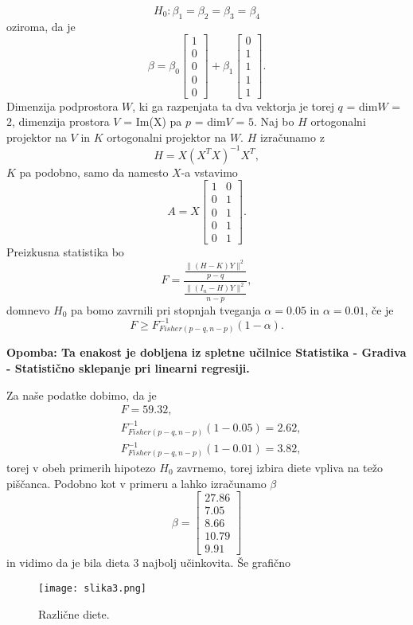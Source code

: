 \documentclass[a4paper,12pt]{article}
\begin{document}
$$ H_0 : \beta_1 = \beta_2 = \beta_3 = \beta_4
$$
oziroma, da je 
$$\beta = \beta_0 \begin{bmatrix}
    1 \\
    0 \\
    0 \\
    0 \\
    0 
\end{bmatrix} + 
\beta_1 \begin{bmatrix}
    0 \\
    1 \\
    1 \\
    1 \\
    1 
\end{bmatrix}.
$$
Dimenzija podprostora $W$, ki ga razpenjata ta dva vektorja je torej $q$ = dim$W$ = $2$, dimenzija prostora $V$ = Im(X) pa $p$ = dim$V$ = $5$.
Naj bo $H$ ortogonalni projektor na $V$ in $K$ ortogonalni projektor na $W$. $H$ izračunamo z 
$$ H = X(X^{T}X)^{-1}X^{T},
$$
$K$ pa podobno, samo da namesto $X$-a vstavimo
$$A =X\begin{bmatrix}
    1 &0\\
    0 &1\\
    0 &1\\
    0 &1\\
    0 &1 
\end{bmatrix}.$$
Preizkusna statistika bo
$$F = \frac{\frac{\|(H - K)Y\|^2}{p - q}}{\frac{\|(I_n - H)Y\|^2}{n - p}},$$
domnevo $H_0$ pa bomo zavrnili pri stopnjah tveganja $\alpha=0.05$ in $\alpha=0.01$, če je 
$$ F \geqslant F^{-1}_{Fisher(p-q, n-p)}\left(1-\alpha\right).
$$

\textbf{Opomba: Ta enakost je dobljena iz spletne učilnice Statistika - Gradiva - Statistično sklepanje pri linearni regresiji.}

Za naše podatke dobimo, da je
\begin{align*}
    &F = 59.32, \\
    &F^{-1}_{Fisher(p-q, n-p)}\left(1-0.05\right) = 2.62, \\
    &F^{-1}_{Fisher(p-q, n-p)}\left(1-0.01\right) = 3.82,
\end{align*}
torej v obeh primerih hipotezo $H_0$ zavrnemo, torej izbira diete vpliva na težo piščanca. Podobno kot v primeru a lahko izračunamo $\beta$
$$\beta = \begin{bmatrix}
    27.86 \\
    7.05 \\
    8.66 \\
    10.79 \\
    9.91 
\end{bmatrix}$$
in vidimo da je bila dieta 3 najbolj učinkovita. Še grafično
\begin{figure}[H]  
	\centering
	\texttt{[image: slika3.png]}
	\caption{Različne diete.}
\end{figure}
\end{document}

